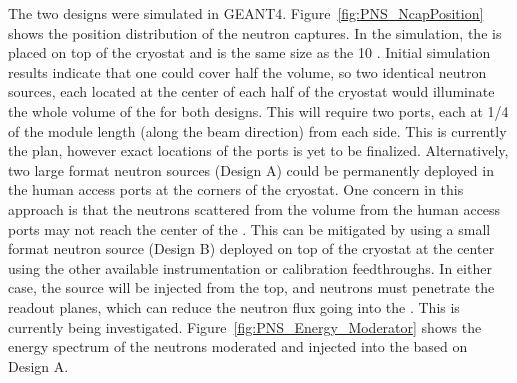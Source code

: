The two designs were simulated in GEANT4. Figure~\ref{fig:PNS_NcapPosition} shows the position distribution of the neutron captures. In the simulation, the  is placed on top of the cryostat and is the same size as the  \SI{10}{\kton} .  Initial simulation results indicate that one  could cover half the  volume, so two identical neutron sources, each located at the center of each half of the cryostat
would illuminate the whole  volume of the   for both designs. This will require two ports, each at 1/4 of the module length (along the beam direction) from each side. This is currently the plan, however exact locations of the ports is yet to be finalized.
Alternatively, two large format neutron sources (Design A) could be permanently deployed in the human access ports at the corners of the cryostat. One concern in this approach is that the neutrons scattered from the  volume from the human access ports may not reach the center of the . This can be mitigated by using a small format neutron source (Design B) deployed on top of the cryostat at the center using the other available instrumentation or calibration feedthroughs. %
In either case, the source will be injected from the top, and neutrons must penetrate the  readout planes, which can reduce the neutron flux going into the . %
This is currently being investigated.
Figure~\ref{fig:PNS_Energy_Moderator} shows the energy spectrum of the neutrons moderated and injected into the  based on Design A.



